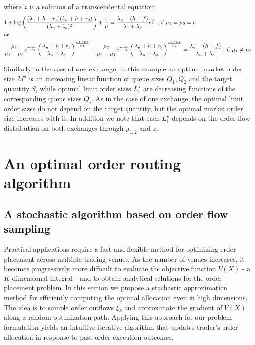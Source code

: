 \documentclass[opre,nonblindrev]{informs3}
\begin{document}
\noindent where $z$ is a solution of a transcendental equation:
\begin{align}
&1+\log\left(\frac{(\lambda_u+h+r_1)(\lambda_u+h+r_2)}{(\lambda_u+\lambda_o)^2}\right)+\frac{z}{\mu}
=\frac{\lambda_u-(h+f)}{\lambda_u+\lambda_o}e^{\frac{z}{\mu}}~\text{, if}~\mu_1=\mu_2=\mu \label{sol.2exchg.exp_mrk_eq} \\
&\text{or}\notag\\
&\frac{\mu_1}{\mu_1-\mu_2}e^{-\frac{z}{\mu_1}}\left(\frac{\lambda_u+h+r_1}{\lambda_u+\lambda_o}\right)^{\frac{\mu_1-\mu_2}{\mu_1}}
+\frac{\mu_2}{\mu_2-\mu_1}e^{-\frac{z}{\mu_2}}\left(\frac{\lambda_u+h+r_2}{\lambda_u+\lambda_o}\right)^{\frac{\mu_2-\mu_1}{\mu_2}} = \frac{\lambda_u-(h+f)}{\lambda_u+\lambda_o}~\text{, if}~\mu_1\neq\mu_2 \label{sol.2exchg.exp_mrk_neq}
\end{align}


\noindent Similarly to the case of one exchange, in this example an optimal market order size $M^\star$ is an increasing linear function of queue sizes $Q_1, Q_2$ and the target quantity $S$, while optimal limit order sizes $L^\star_i$ are decreasing functions of the corresponding queue sizes $Q_i$. As in the case of one exchange, the optimal limit order sizes do not depend on the target quantity, but the optimal market order size increases with it. In addition we note that each $L^\star_i$ depends on the order flow distribution on both exchanges through $\mu_{1,2}$ and $z$.
\fi


\section{An optimal order routing algorithm}\label{sec.sa}
\subsection{A stochastic algorithm based on order flow sampling}

Practical applications require a fast and flexible method for optimizing order placement across multiple trading venues. As the number of venues increases, it becomes progressively more difficult to evaluate the objective function $V(X)$ - a $K$-dimensional integral - and to obtain analytical solutions for the order placement problem. In this section we propose a stochastic approximation method for  efficiently computing the optimal allocation even in high dimensions. The idea is to sample  order outflows $\xi_k$ and approximate the gradient of $V(X)$ along a random optimization path. Applying this approach for our problem formulation yields an intuitive iterative algorithm that updates trader's order allocation in response to past order execution outcomes.
\end{document}
